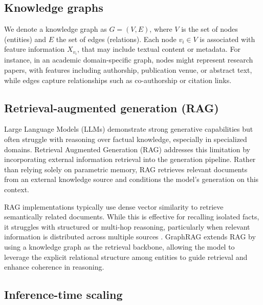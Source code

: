 \subsection{Knowledge graphs}

We denote a knowledge graph as \( G = (V, E) \), where \( V \) is the set of nodes (entities) and \( E \) the set of edges (relations). Each node \( v_i \in V \) is associated with feature information \( X_{v_i} \), that may include textual content or metadata. For instance, in an academic domain-specific graph, nodes might represent research papers, with features including authorship, publication venue, or abstract text, while edges capture relationships such as co-authorship or citation links.

\subsection{Retrieval-augmented generation (RAG)}

Large Language Models (LLMs) demonstrate strong generative capabilities but often struggle with reasoning over factual knowledge, especially in specialized domains. Retrieval Augmented Generation (RAG) \citep{lewis2020retrieval} addresses this limitation by incorporating external information retrieval into the generation pipeline. Rather than relying solely on parametric memory, RAG retrieves relevant documents from an external knowledge source and conditions the model’s generation on this context.

RAG implementations typically use dense vector similarity \citep{fan2024surveyragmeetingllms, devlin-etal-2019-bert} to retrieve semantically related documents. While this is effective for recalling isolated facts, it struggles with structured or multi-hop reasoning, particularly when relevant information is distributed across multiple sources \citep{tang2024multihoprag}. GraphRAG \citep{edge2025localglobalgraphrag} extends RAG by using a knowledge graph as the retrieval backbone, allowing the model to leverage the explicit relational structure among entities to guide retrieval and enhance coherence in reasoning.

\subsection{Inference-time scaling}

